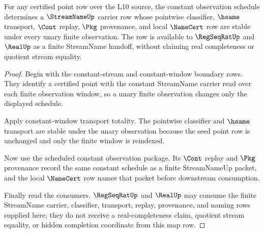 \begin{theorem}
\label{thm:streamname-constant-observation-map-row}
For any certified point row over the L10 source, the constant observation schedule determines a $\StreamNameUp$ carrier row whose pointwise classifier, $\hsame$ transport, $\Cont$ replay, $\Pkg$ provenance, and local $\NameCert$ row are stable under every unary finite observation. The row is available to $\RegSeqRatUp$ and $\RealUp$ as a finite StreamName handoff, without claiming real completeness or quotient stream equality.
\end{theorem}
\begin{proof}
Begin with the constant-stream and constant-window boundary rows. They identify a certified point with the constant StreamName carrier read over each finite observation window, so a unary finite observation changes only the displayed schedule.

Apply constant-window transport totality. The pointwise classifier and $\hsame$ transport are stable under the unary observation because the seed point row is unchanged and only the finite window is reindexed.

Now use the scheduled constant observation package. Its $\Cont$ replay and $\Pkg$ provenance record the same constant schedule as a finite StreamNameUp packet, and the local $\NameCert$ row names that packet before downstream consumption.

Finally read the consumers. $\RegSeqRatUp$ and $\RealUp$ may consume the finite StreamName carrier, classifier, transport, replay, provenance, and naming rows supplied here; they do not receive a real-completeness claim, quotient stream equality, or hidden completion coordinate from this map row.
\end{proof}

